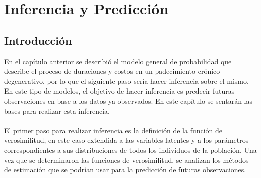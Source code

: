 \chapter{Inferencia y Predicci\'on}
\section{Introducci\'on}
En el cap\'itulo anterior se describi\'o el modelo general de probabilidad que describe el proceso de duraciones y costos en un padecimiento cr\'onico degenerativo, por lo que el siguiente paso ser\'ia hacer inferencia sobre el mismo. En este tipo de modelos, el objetivo de hacer inferencia es predecir futuras observaciones en base a los datos ya observados. En este cap\'itulo se sentar\'an las bases para realizar esta inferencia.\\
\\
El primer paso para realizar inferencia es la definici\'on de la funci\'on de verosimilitud, en este caso extendida a las variables latentes y a los par\'ametros correspondientes a sus distribuciones de todos los individuos de la poblaci\'on. Una vez que se determinaron las funciones de verosimilitud, se analizan los m\'etodos de estimaci\'on que se podr\'ian usar para la predicci\'on de futuras observaciones. %
